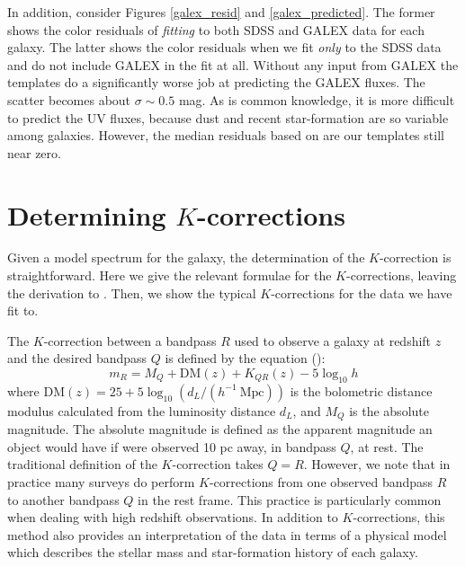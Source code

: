 \documentclass[10pt,preprint]{aastex}
\begin{document}
In addition, consider Figures \ref{galex_resid} and
\ref{galex_predicted}. The former shows the color residuals of {\it
fitting} to both SDSS and GALEX data for each galaxy. The latter shows
the color residuals when we fit {\it only} to the SDSS data and do not
include GALEX in the fit at all. Without any input from GALEX the
templates do a significantly worse job at predicting the GALEX
fluxes. The scatter becomes about $\sigma \sim 0.5$ mag.  As is common
knowledge, it is more difficult to predict the UV fluxes, because dust
and recent star-formation are so variable among galaxies. However, the
median residuals based on are our templates still near zero.

\section{Determining $K$-corrections}
\label{kcorrect}

Given a model spectrum for the galaxy, the determination of the
$K$-correction is straightforward. Here we give the relevant formulae
for the $K$-corrections, leaving the derivation to \citet{hogg02a}.
Then, we show the typical $K$-corrections for the data we have fit
to. 

The $K$-correction between a bandpass $R$ used to observe a galaxy at
redshift $z$ and the desired bandpass $Q$ is defined by the equation
(\citealt{oke68a, hogg02a}):
\begin{equation}
\label{kcorrecteqn}
m_R = M_Q + \mathrm{DM}(z) + K_{QR}(z) - 5 \log_{10} h 
\end{equation}
where $\mathrm{DM}(z) = 25 + 5\log_{10} (d_L /
(h^{-1}{\mathrm{~Mpc}}))$ is the bolometric distance modulus
calculated from the luminosity distance $d_L$, and $M_Q$ is the
absolute magnitude. The absolute magnitude is defined as the apparent
magnitude an object would have if were observed 10 pc away, in
bandpass $Q$, at rest.  The traditional definition of the
$K$-correction takes $Q=R$. However, we note that in practice many
surveys do perform $K$-corrections from one observed bandpass $R$ to
another bandpass $Q$ in the rest frame. This practice is particularly
common when dealing with high redshift observations.  In addition to
$K$-corrections, this method also provides an interpretation of the
data in terms of a physical model which describes the stellar mass and
star-formation history of each galaxy.
\end{document}
